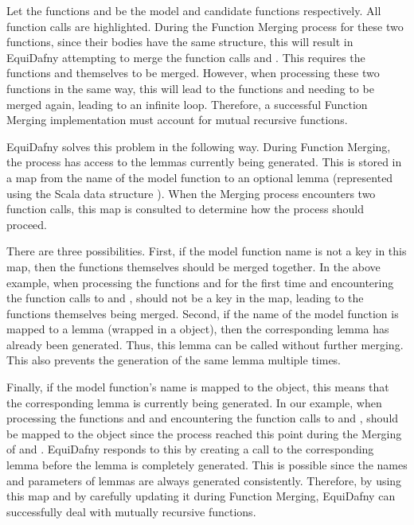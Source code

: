 Let the functions  and  be the model and candidate functions respectively. All function calls are highlighted. During the Function Merging process for these two functions, since their bodies have the same structure, this will result in EquiDafny attempting to merge the function calls  and . This requires the functions  and  themselves to be merged. However, when processing these two functions in the same way, this will lead to the functions  and  needing to be merged again, leading to an infinite loop. Therefore, a successful Function Merging implementation must account for mutual recursive functions. 

EquiDafny solves this problem in the following way. During Function Merging, the process has access to the lemmas currently being generated. This is stored in a map from the name of the model function to an optional lemma (represented using the Scala data structure ). When the Merging process encounters two function calls, this map is consulted to determine how the process should proceed.

There are three possibilities. First, if the model function name is not a key in this map, then the functions themselves should be merged together. In the above example, when processing the functions  and  for the first time and encountering the function calls to  and ,  should not be a key in the map, leading to the functions themselves being merged. Second, if the name of the model function is mapped to a lemma (wrapped in a  object), then the corresponding lemma has already been generated. Thus, this lemma can be called without further merging. This also prevents the generation of the same lemma multiple times.

Finally, if the model function's name is mapped to the  object, this means that the corresponding lemma is currently being generated. In our example, when processing the functions  and  and encountering the function calls to  and ,  should be mapped to the  object since the process reached this point during the Merging of  and . EquiDafny responds to this by creating a call to the corresponding lemma before the lemma is completely generated. This is possible since the names and parameters of lemmas are always generated consistently. Therefore, by using this map and by carefully updating it during Function Merging, EquiDafny can successfully deal with mutually recursive functions. 

